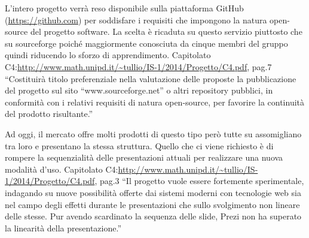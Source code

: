 L’intero progetto verrà reso disponibile sulla piattaforma GitHub (\url{https://github.com})  per soddisfare i requisiti che impongono la natura open-source del progetto software.
La scelta è ricaduta su questo servizio piuttosto che su sourceforge poiché maggiormente conosciuta da cinque membri del gruppo quindi riducendo lo sforzo di apprendimento.
Capitolato C4:\url{http://www.math.unipd.it/~tullio/IS-1/2014/Progetto/C4.pdf}, pag.7
	 “Costituirà titolo preferenziale nella valutazione delle proposte la pubblicazione del progetto sul sito “www.sourceforge.net” o altri repository pubblici, in conformità con i relativi requisiti di natura open-source, per favorire la continuità del prodotto risultante.”

Ad oggi, il mercato offre molti prodotti di questo tipo però tutte su assomigliano tra loro e presentano la stessa struttura. Quello che ci viene richiesto è di rompere la sequenzialità delle presentazioni attuali per realizzare una nuova modalità d’uso.
Capitolato C4:\url{http://www.math.unipd.it/~tullio/IS-1/2014/Progetto/C4.pdf}, pag.3
“Il progetto vuole essere fortemente sperimentale, indagando su nuove possibilità offerte dai sistemi moderni con tecnologie web sia nel campo degli effetti durante le presentazioni che sullo svolgimento non lineare delle stesse. Pur avendo scardinato la sequenza delle slide, Prezi non ha superato la linearità della presentazione.”
